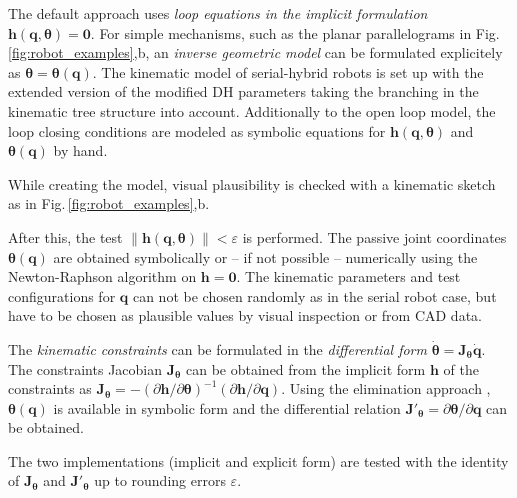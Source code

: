 \documentclass[runningheads]{llncs}
\begin{document}
\begin{property}\label{prop:hyb_constr}
The default approach uses \emph{loop equations in the implicit formulation} $\bm{h}(\bm{q},\bm{\theta}){=}\bm{0}$. 
For simple mechanisms, such as the planar parallelograms in Fig.\,\ref{fig:robot_examples},b, an \emph{inverse geometric model} can be formulated explicitely as $\bm{\theta}{=}\bm{\theta}(\bm{q})$.
The kinematic model of serial-hybrid robots is set up with the extended version of the modified DH parameters \cite{KhalilDom2002,BriotKha2015} taking the branching in the kinematic tree structure into account.
Additionally to the open loop model, the loop closing conditions are modeled as symbolic equations for $\bm{h}(\bm{q},\bm{\theta})$ and $\bm{\theta}(\bm{q})$ by hand.
\end{property}
\begin{test}\label{test:hyb_plausibility}
While creating the model, visual plausibility is checked with a kinematic sketch as in Fig.\,\ref{fig:robot_examples},b.
\end{test}
\begin{test}\label{test:hyb_constraints}
After this, the test $\lVert\bm{h}(\bm{q},\bm{\theta})\rVert {<} \varepsilon$ is performed.
The passive joint coordinates $\bm{\theta}(\bm{q})$ are obtained symbolically or -- if not possible -- numerically using the Newton-Raphson algorithm on $\bm{h}{=}\bm{0}$.
The kinematic parameters and test configurations for $\bm{q}$ can not be chosen randomly as in the serial robot case, but have to be chosen as plausible values by visual inspection or from CAD data.
\end{test}


\begin{property}\label{prop:hyb_constrD}
The \emph{kinematic constraints} can be formulated in the \emph{differential form} $\dot{\bm{\theta}} {=} \bm{J}_{\bm{\theta}} \dot{\bm{q}}$.
%
The constraints Jacobian $\bm{J}_{\bm{\theta}}$ can be obtained from the implicit form $\bm{h}$ of the constraints as $\bm{J}_{\bm{\theta}}{=}{-}(\partial \bm{h}/\partial \bm{\theta})^{-1}(\partial \bm{h}/\partial \bm{q})$.
Using the elimination approach \cite{SchapplerLilHad2019}, $\bm{\theta}(\bm{q})$ is available in symbolic form and the differential relation $\bm{J}'_{\bm{\theta}}{=}\partial \bm{\theta} / \partial \bm{q}$ \cite{NakamuraGho1989} can be obtained.
\end{property}
\begin{test}\label{test:hyb_constrD}
The two implementations (implicit and explicit form) are tested with the identity of $\bm{J}_{\bm{\theta}}$ and $\bm{J}'_{\bm{\theta}}$ up to rounding errors $\varepsilon$.
\end{test}
\end{document}
